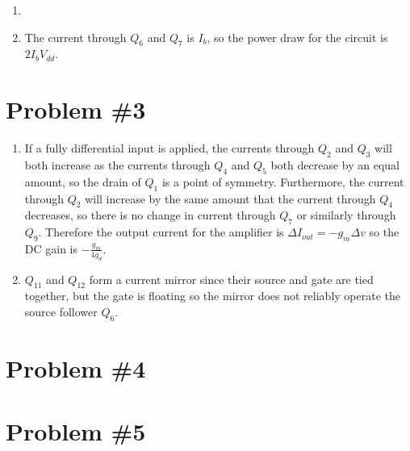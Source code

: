 \documentclass{article}
\begin{document}
\begin{enumerate}
{\begin{circuitikz}
  (q1.source) -- ++(0,0) node[sground] {}
  (q1.gate)   -- (q8.gate)

  (q8.source) -- ++(0,0) node[sground] {}
  (q8.gate)   node[circ] {} |- (q8.drain) node[circ] {}

  (q7.drain)  to[I, i=$I_b$] (q8.drain)
  (q7.source) -- ++(0,0) node[rground, yscale=-1] {}
  (q7.gate)   node[circ] {} |- (q7.drain) node[circ] {}

  (q6.source) -- ++(0,0) node[rground, yscale=-1] {}
  (q6.gate) -- (q7.gate)
;\end{circuitikz}
A fully differential input to this amplifier will cause no change in the 
current through $Q_1$, and thus no change in the voltage at the source of
the input stage transistors. Therefore this is a point of symmetry. As
$V_{in}^{+}$ increases by $\Delta v$ and $V_{in}^{-}$ decreases by 
$\Delta v$, the current through $Q_2$ increases by $g_m \Delta v$ and the
current through $Q_3$ (as reflected by the current mirror $Q_5$) decreases
by $g_m \Delta v$. Therefore the change in output current is 
$-g_m \Delta v - g_m \Delta v = -2 g_m \Delta v$. The output resistance is
the drain resistance $\frac{1}{g_d}$ of $Q_2$ in parallel with the drain
resistance $\frac{1}{g_d}$ of $Q_3$ and is thus about $\frac{1}{2g_d}$, so
the DC gain is
$$
A_v = \frac{-2 \frac{g_m}{g_d} \Delta v}{2 \Delta v} = -\frac{g_m}{g_d}.
$$ 
}
\item
{
}
\item
{
The current through $Q_6$ and $Q_7$ is $I_b$, so the power draw for the circuit
is $2 I_b V_{dd}$.
}
\end{enumerate}



\section*{Problem \#3}
\begin{enumerate}
\item{
If a fully differential input is applied, the currents through $Q_2$ and
$Q_3$ will both increase as the currents through $Q_4$ and $Q_5$ both 
decrease by an equal amount, so the drain of $Q_1$ is a point of symmetry.
Furthermore, the current through $Q_2$ will increase by the same amount 
that the current through $Q_4$ decreases, so there is no change in 
current through $Q_7$ or similarly through $Q_9$. Therefore the 
output current for the amplifier is $\Delta I_{out} = -g_m \Delta v$
so the DC gain is $-\frac{g_m}{4 g_d}$.
}
\item{
$Q_{11}$ and $Q_{12}$ form a current mirror since their source and gate are 
tied together, but the gate is floating so the mirror does not reliably 
operate the source follower $Q_6$.

}
\end{enumerate}

\section*{Problem \#4}


\section*{Problem \#5}
\end{document}
